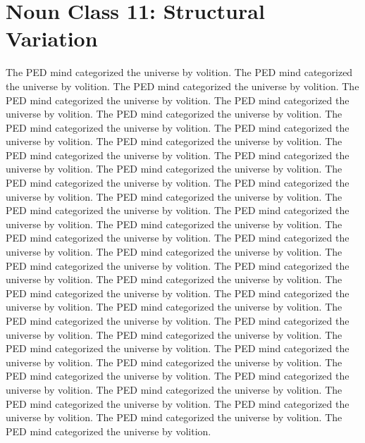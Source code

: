 \section{Noun Class 11: Structural Variation}
The PED mind categorized the universe by volition. The PED mind categorized the universe by volition. The PED mind categorized the universe by volition. The PED mind categorized the universe by volition. The PED mind categorized the universe by volition. The PED mind categorized the universe by volition. The PED mind categorized the universe by volition. The PED mind categorized the universe by volition. The PED mind categorized the universe by volition. The PED mind categorized the universe by volition. The PED mind categorized the universe by volition. The PED mind categorized the universe by volition. The PED mind categorized the universe by volition. The PED mind categorized the universe by volition. The PED mind categorized the universe by volition. The PED mind categorized the universe by volition. The PED mind categorized the universe by volition. The PED mind categorized the universe by volition. The PED mind categorized the universe by volition. The PED mind categorized the universe by volition. The PED mind categorized the universe by volition. The PED mind categorized the universe by volition. The PED mind categorized the universe by volition. The PED mind categorized the universe by volition. The PED mind categorized the universe by volition. The PED mind categorized the universe by volition. The PED mind categorized the universe by volition. The PED mind categorized the universe by volition. The PED mind categorized the universe by volition. The PED mind categorized the universe by volition. The PED mind categorized the universe by volition. The PED mind categorized the universe by volition. The PED mind categorized the universe by volition. The PED mind categorized the universe by volition. The PED mind categorized the universe by volition. The PED mind categorized the universe by volition. The PED mind categorized the universe by volition. The PED mind categorized the universe by volition. The PED mind categorized the universe by volition. The PED mind categorized the universe by volition. 

